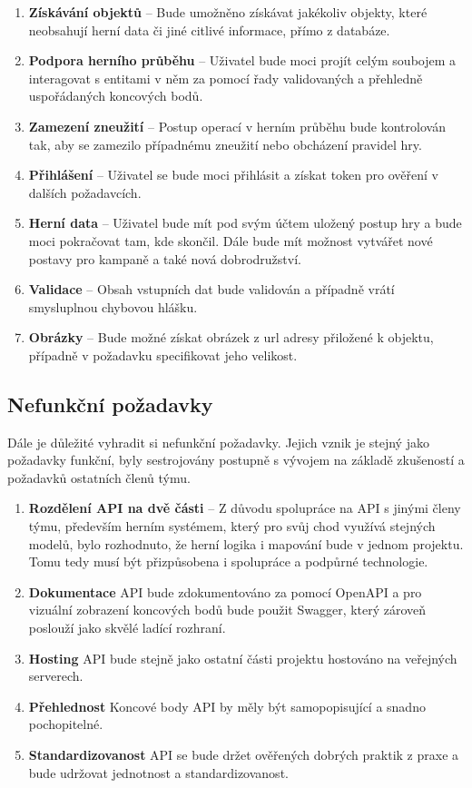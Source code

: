 \begin{enumerate}[label=\textbf{F\arabic*}:, leftmargin=*, align=left]
    \item \textbf{Získávání objektů} -- Bude umožněno získávat jakékoliv objekty, které neobsahují herní data či jiné citlivé informace, přímo z databáze.
    \item \textbf{Podpora herního průběhu} -- Uživatel bude moci projít celým soubojem a interagovat s entitami v něm za pomocí řady validovaných a přehledně uspořádaných koncových bodů.
    \item \textbf{Zamezení zneužití} -- Postup operací v herním průběhu bude kontrolován tak, aby se zamezilo případnému zneužití nebo obcházení pravidel hry.
    \item \textbf{Přihlášení} -- Uživatel se bude moci přihlásit a získat token pro ověření v dalších požadavcích.
    \item \textbf{Herní data} -- Uživatel bude mít pod svým účtem uložený postup hry a bude moci pokračovat tam, kde skončil. Dále bude mít možnost vytvářet nové postavy pro kampaně a také nová dobrodružství.
    \item \textbf{Validace} -- Obsah vstupních dat bude validován a případně vrátí smysluplnou chybovou hlášku.
    \item \textbf{Obrázky} -- Bude možné získat obrázek z url adresy přiložené k objektu, případně v požadavku specifikovat jeho velikost.
\end{enumerate}



\subsection{Nefunkční požadavky}
Dále je důležité vyhradit si nefunkční požadavky. Jejich vznik je stejný jako požadavky funkční, byly sestrojovány postupně s vývojem na základě zkušeností a požadavků ostatních členů týmu.


\begin{enumerate}[label=\textbf{F\arabic*}:, leftmargin=*, align=left]
    \item \textbf{Rozdělení API na dvě části} -- Z důvodu spolupráce na API s jinými členy týmu, především herním systémem, který pro svůj chod využívá stejných modelů, bylo rozhodnuto, že herní logika i mapování bude v jednom projektu. Tomu tedy musí být přizpůsobena i spolupráce a podpůrné technologie.
    \item \textbf{Dokumentace} API bude zdokumentováno za pomocí OpenAPI a pro vizuální zobrazení koncových bodů bude použit Swagger, který zároveň poslouží jako skvělé ladící rozhraní.
    \item \textbf{Hosting} API bude stejně jako ostatní části projektu hostováno na veřejných serverech.
    \item \textbf{Přehlednost} Koncové body API by měly být samopopisující a snadno pochopitelné.
    \item \textbf{Standardizovanost} API se bude držet ověřených dobrých praktik z praxe a bude udržovat jednotnost a standardizovanost.
\end{enumerate}

